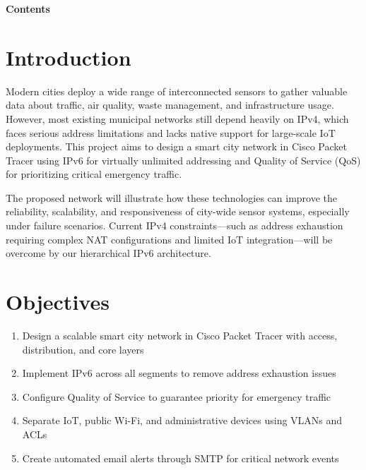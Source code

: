 \documentclass[12pt,a4paper]{article}
\begin{document}
\newpage
\begin{center}
    {\Huge \textbf{Contents}}
\end{center}
\vspace{1.5em}

\tableofcontents
\newpage



\section*{Introduction}
{}
Modern cities deploy a wide range of interconnected sensors to gather valuable data about traffic, air quality, waste management, and infrastructure usage. However, most existing municipal networks still depend heavily on IPv4, which faces serious address limitations and lacks native support for large-scale IoT deployments. This project aims to design a smart city network in Cisco Packet Tracer using IPv6 for virtually unlimited addressing and Quality of Service (QoS) for prioritizing critical emergency traffic.

The proposed network will illustrate how these technologies can improve the reliability, scalability, and responsiveness of city-wide sensor systems, especially under failure scenarios. Current IPv4 constraints—such as address exhaustion requiring complex NAT configurations and limited IoT integration—will be overcome by our hierarchical IPv6 architecture.

\section*{Objectives}
{}
\begin{enumerate}[label=2.\arabic*, nosep]
    \item Design a scalable smart city network in Cisco Packet Tracer with access, distribution, and core layers
    \item Implement IPv6 across all segments to remove address exhaustion issues
    \item Configure Quality of Service to guarantee priority for emergency traffic
    \item Separate IoT, public Wi-Fi, and administrative devices using VLANs and ACLs
    \item Create automated email alerts through SMTP for critical network events
\end{enumerate}
\end{document}
